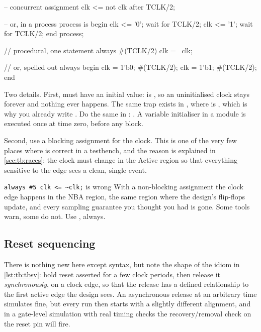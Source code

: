 \begin{rosetta}
\begin{rleft}
-- concurrent assignment
clk <= not clk after TCLK/2;

-- or, in a process
process is
begin
  clk <= '0';
  wait for TCLK/2;
  clk <= '1';
  wait for TCLK/2;
end process;
\end{rleft}
\begin{rright}
// procedural, one statement
always #(TCLK/2) clk = ~clk;

// or, spelled out
always begin
  clk = 1'b0;
  #(TCLK/2);
  clk = 1'b1;
  #(TCLK/2);
end
\end{rright}
\end{rosetta}

Two details. First,  must have an initial value:  is
, so an uninitialised clock stays  forever and nothing ever
happens. The same trap exists in \VHDL{}, where  is ,
which is why you already write . Do the
same in \SV{}: . A variable initialiser in a module is
executed once at time zero, before any  block.

Second, use a blocking assignment for the clock. This is one of the very few
places where \code{=} is correct in a testbench, and the reason is explained in
\cref{sec:tb:races}: the clock must change in the Active region so that
everything sensitive to the edge sees a clean, single event.

\begin{gotcha}{\texttt{always \#5 clk <= \textasciitilde clk;} is wrong}
With a non-blocking assignment the clock edge happens in the NBA region, the
same region where the design's flip-flops update, and every sampling guarantee
you thought you had is gone. Some tools warn, some do not. Use
, always.
\end{gotcha}

\subsection{Reset sequencing}

There is nothing new here except syntax, but note the shape of the idiom in
\cref{lst:tb:tbsv}: hold reset asserted for a few clock periods, then release
it \emph{synchronously}, on a clock edge, so that the release has a defined
relationship to the first active edge the design sees. An asynchronous release
at an arbitrary time simulates fine, but every run then starts with a slightly
different alignment, and in a gate-level simulation with real timing checks the
recovery/removal check on the reset pin will fire.

